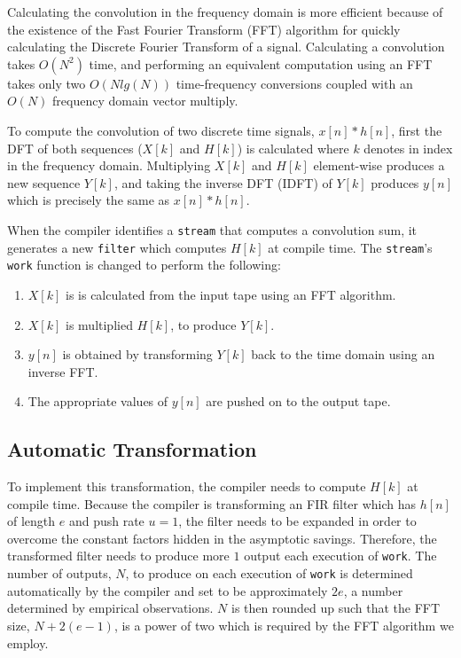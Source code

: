 Calculating the convolution in the frequency domain is more efficient
because of the existence of the Fast Fourier Transform (FFT) algorithm
for quickly calculating the Discrete Fourier Transform of a signal.
Calculating a convolution takes $O(N^2)$ time, and performing an equivalent
computation using an FFT takes only two $O(N lg(N))$
time-frequency conversions coupled with an $O(N)$ frequency domain
vector multiply.


To compute the convolution of two discrete time signals, $x[n]*h[n]$,
first the DFT of both sequences ($X[k]$ and $H[k]$) is calculated where
$k$ denotes in index in the frequency domain.
Multiplying $X[k]$ and $H[k]$ element-wise produces a new
sequence $Y[k]$, and taking the inverse DFT (IDFT) of $Y[k]$ produces
$y[n]$ which is precisely the same as $x[n]*h[n]$.

When the compiler identifies a {\tt stream} that computes a convolution sum,
it generates a new {\tt filter} which computes $H[k]$ at compile time. 
The {\tt stream}'s {\tt work} function is changed to perform the following:
\begin{enumerate}
\item $X[k]$ is is calculated from the input tape using an FFT algorithm. 
\vspace{-6pt}
\item $X[k]$ is multiplied $H[k]$, to produce $Y[k]$. 
\vspace{-6pt}
\item $y[n]$ is obtained by transforming $Y[k]$ back to the time domain using an inverse FFT.
\vspace{-6pt}
\item The appropriate values of $y[n]$ are pushed on to the output tape.
\end{enumerate} 

\subsection{Automatic Transformation}

To implement this transformation, the compiler needs to compute $H[k]$ at
compile time. Because the compiler is transforming an FIR filter 
which has $h[n]$ of length $e$ and push rate $u=1$, the filter needs to be 
expanded in order to overcome the constant factors hidden in the asymptotic savings.
Therefore, the transformed filter needs to produce more $1$ output each
execution of {\tt work}. The number of outputs, $N$, to produce on each 
execution of {\tt work} is determined automatically by the compiler and set to be 
approximately $2e$, a number determined by empirical observations. $N$ is then rounded 
up such that the FFT size, $N+2(e-1)$, is a power of 
two which is required by the FFT algorithm we employ.

